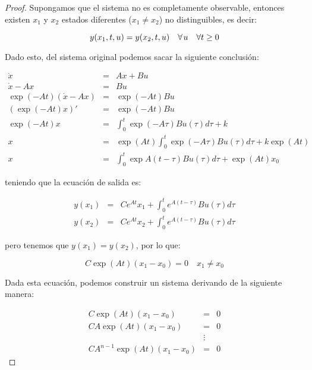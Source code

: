 		\begin{proof}
			Supongamos que el sistema no es completamente observable, entonces existen $x_1$ y $x_2$ estados diferentes ($x_1 \ne x_2$) no distinguibles, es decir:

			\begin{equation*}
				y(x_1, t, u) = y(x_2, t, u) \quad \forall \mkern2mu u \quad \forall t \geq 0
			\end{equation*}

			Dado esto, del sistema original podemos sacar la siguiente conclusión:

			\begin{eqnarray*}
				\dot{x} & = & A x + B u \\
				\dot{x} - A x & = & B u \\
				\exp{(-A t)} (\dot{x} - A x) & = & \exp{(-A t)} B u \\
				(\exp{(-A t)} x)' & = & \exp{(-A t)} B u \\
				\exp{(-A t)} x & = & \int_0^t \exp{(-A \tau)} B u(\tau) d\tau + k \\
				x & = & \exp{(A t)} \int_0^t \exp{(-A \tau)} B u(\tau) d\tau + k \exp{(A t)}\\
				x & = & \int_0^t \exp{A(t - \tau)} B u(\tau) d\tau + \exp{(At)}x_0
			\end{eqnarray*}

			teniendo que la ecuación de salida es:

			\begin{eqnarray*}
				y(x_1) & = & C e^{A t} x_1 + \int_0^t e^{A(t - \tau)} B u(\tau) d\tau \\
				y(x_2) & = & C e^{A t} x_2 + \int_0^t e^{A(t - \tau)} B u(\tau) d\tau
			\end{eqnarray*}

			pero tenemos que $y(x_1) = y(x_2)$, por lo que:

			\begin{equation*}
				C \exp{(A t)} (x_1 - x_0) = 0 \quad x_1 \ne x_0
			\end{equation*}

			Dada esta ecuación, podemos construir un sistema derivando de la siguiente manera:

			\begin{eqnarray*}
				C \exp{(A t)} (x_1 - x_0) & = & 0 \\
				C A \exp{(A t)} (x_1 - x_0) & = & 0 \\
				& \vdots & \\
				C A^{n-1} \exp{(A t)} (x_1 - x_0) & = & 0
			\end{eqnarray*}


\end{proof}
